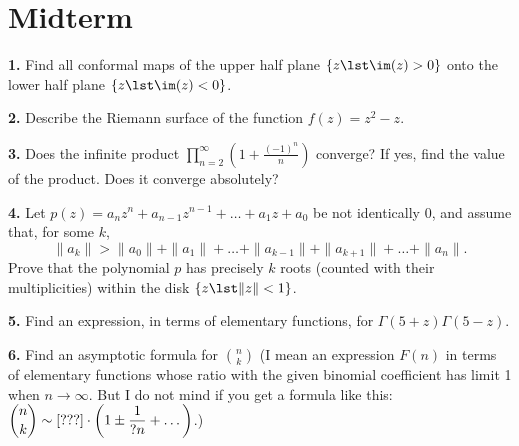
\section*{Midterm}\renewcommand{\leftmark}{Midterm}

\textbf{1.\enspace} Find all conformal maps of the upper half
plane $\{z\lst\im(z)>0\}$ onto the lower half plane $\{z\lst\im(z)<0\}$. 

\bigbreak
\textbf{2.\enspace} Describe the Riemann surface of the function $f(z)=z^{2}-z$.

\bigbreak
\textbf{3.\enspace} Does the infinite product
$\displaystyle\prod^{\infty}_{n=2}\left(1+\frac{(-1)^{n}}{n}\right)$
converge? If yes, find the value of the product. Does it converge absolutely?

\bigbreak
\textbf{4.\enspace} Let $p(z) = a_{n} z^{n} + a_{n-1} z^{n-1} + \dots + a_{1} z + a_{0}$ be not identically 0, and assume that,
for some $k$,
\[
\|a_{k}\| > \|a_{0}\| + \|a_{1}\| + \dots + \|a_{k-1}\| + \|a_{k+1}\| + \dots + \|a_{n}\|.
\]
Prove that the polynomial $p$ has precisely $k$ roots (counted
with their multiplicities) within the disk $\{z\lst\|z\|<1\}$. 


\bigbreak
\textbf{5.\enspace} Find an expression, in terms of elementary functions, for $\Gamma(5 + z)\Gamma(5 - z)$.

\bigbreak
\textbf{6.\enspace} Find an asymptotic formula for $\displaystyle\binom{n}{k}$
(I mean an expression $F (n)$ in terms of elementary functions
whose ratio with the given binomial coefficient has limit 1 when $n\to\infty$. But I do not mind if you get a formula like this:
$\displaystyle\binom{n}{k}\sim[???]\cdot\left(1\pm\frac{1}{?n}+\dots\right)$.)
